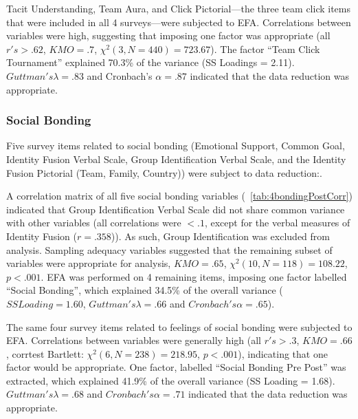\begin{CJK}{UTF8}{gbsn}
Tacit Understanding, Team Aura, and Click Pictorial---the three team click items that were included in all 4 surveys---were subjected to EFA.  Correlations between variables were high, suggesting that imposing one factor was appropriate (all $r's > .62$, $KMO = .7$, $\chi^2(3, N = 440) = 723.67$).  The factor ``Team Click Tournament'' explained 70.3\% of the variance (SS Loadings = 2.11).  $Guttman's \lambda =.83$ and Cronbach's $\alpha = .87$ indicated that the data reduction was appropriate.




\subsubsection{Social Bonding}
Five survey items related to social bonding (Emotional Support, Common Goal, Identity Fusion Verbal Scale, Group Identification Verbal Scale, and the Identity Fusion Pictorial (Team, Family, Country)) were subject to data reduction:.

A correlation matrix of all five social bonding variables (~\ref{tab:4bondingPostCorr}) indicated that Group Identification Verbal Scale did not share common variance with other variables (all correlations were $<.1$, except for the verbal measures of Identity Fusion ($r =.358$)). As such, Group Identification was excluded from analysis.  Sampling adequacy variables suggested that the remaining subset of variables were appropriate for analysis, $KMO = .65$, $\chi^2(10, N = 118) = 108.22$, $p < .001$.  EFA was performed on 4 remaining items, imposing one factor labelled ``Social Bonding'', which explained 34.5\% of the overall variance ($SS Loading = 1.60$, $Guttman's \lambda =.66$ and $Cronbach's \alpha = .65$).

The same four survey items related to feelings of social bonding were subjected to EFA.  Correlations between variables were generally high (all $r's > .3$, $KMO = .66$, corrtest Bartlett: $\chi^2(6, N = 238) = 218.95$, $p < .001$), indicating that one factor would be appropriate.  One factor, labelled ``Social Bonding Pre Post'' was extracted, which explained 41.9\% of the overall variance (SS Loading = 1.68).  $Guttman's \lambda =.68$ and $Cronbach's \alpha = .71$ indicated that the data reduction was appropriate.


\end{CJK}
